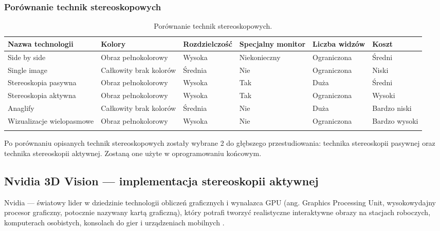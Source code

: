 \subsubsection{Porównanie technik stereoskopowych}
\begin{table}[H]
\caption{Porównanie technik stereoskopowych.}
\centering
\footnotesize
\label{tab11}
\begin{tabular}{!{\color{sapphire}\vrule width 1pt}m{0.146\textwidth}!{\color{black}\vrule width 1pt}m{0.146\textwidth}!{\color{black}\vrule width 1pt}m{0.146\textwidth}!{\color{black}\vrule width 1pt}m{0.146\textwidth}!{\color{black}\vrule width 1pt}m{0.146\textwidth}!{\color{black}\vrule width 1pt}m{0.146\textwidth}!{\color{sapphire}\vrule width 1pt}}
	\hline
	\Centering\bfseries Nazwa technologii &
	\Centering\bfseries Kolory &
	\Centering\bfseries Rozdzielczość &
	\Centering\bfseries Specjalny monitor &
	\Centering\bfseries Liczba widzów &
	\Centering\bfseries Koszt \\
	\hline
	Side by side & Obraz pełnokolorowy & Wysoka & Niekonieczny & Ograniczona & Średni \\ 
	\hline
	Single image & Całkowity brak kolorów & Średnia & Nie & Ograniczona & Niski \\ 
	\hline
	Stereoskopia pasywna & Obraz pełnokolorowy & Wysoka & Tak & Duża & Średni \\ 
	\hline
	Stereoskopia aktywna & Obraz pełnokolorowy & Wysoka & Tak & Ograniczona & Wysoki \\ 
	\hline
	Anaglify & Całkowity brak kolorów & Średnia & Nie & Duża & Bardzo niski \\ 
	\hline
	Wizualizacje wielopasmowe & Obraz pełnokolorowy & Wysoka & Nie & Ograniczona & Bardzo wysoki \\ 
	\hline
\end{tabular}
\end{table}

Po porównaniu opisanych technik stereoskopowych zostały wybrane 2 do głębszego przestudiowania: technika stereoskopii pasywnej oraz technika stereoskopii aktywnej. Zostaną one użyte w oprogramowaniu końcowym.
\newpage
\subsection{Nvidia 3D Vision --- implementacja stereoskopii aktywnej}
Nvidia --- światowy lider w dziedzinie technologii obliczeń graficznych i wynalazca GPU (ang. Graphics Processing Unit, wysokowydajny procesor graficzny, potocznie nazywany kartą graficzną), który potrafi tworzyć realistyczne interaktywne obrazy na stacjach roboczych, komputerach osobistych, konsolach do gier i urządzeniach mobilnych \cite{NvidiaInfo}. 

